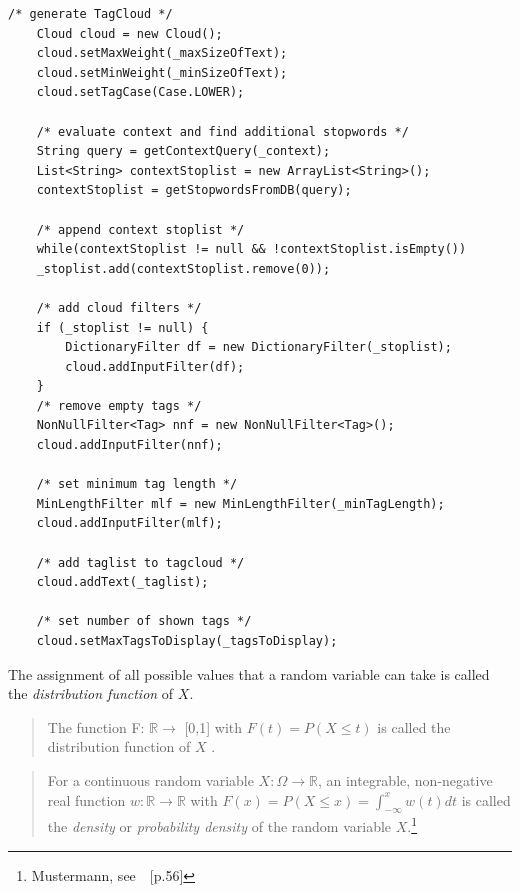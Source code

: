 \lstset{language=java}
\begin{lstlisting}[frame=htrbl, caption={This listing shows Java source code}, label={lst:result2}]
    /* generate TagCloud */
    Cloud cloud = new Cloud();
    cloud.setMaxWeight(_maxSizeOfText);
    cloud.setMinWeight(_minSizeOfText);
    cloud.setTagCase(Case.LOWER);
    
    /* evaluate context and find additional stopwords */
    String query = getContextQuery(_context);
    List<String> contextStoplist = new ArrayList<String>();
    contextStoplist = getStopwordsFromDB(query);
    
    /* append context stoplist */
    while(contextStoplist != null && !contextStoplist.isEmpty())
    _stoplist.add(contextStoplist.remove(0));
    
    /* add cloud filters */
    if (_stoplist != null) {
        DictionaryFilter df = new DictionaryFilter(_stoplist);
        cloud.addInputFilter(df);
    }
    /* remove empty tags */
    NonNullFilter<Tag> nnf = new NonNullFilter<Tag>();
    cloud.addInputFilter(nnf);
    
    /* set minimum tag length */
    MinLengthFilter mlf = new MinLengthFilter(_minTagLength);
    cloud.addInputFilter(mlf);
    
    /* add taglist to tagcloud */
    cloud.addText(_taglist);
    
    /* set number of shown tags */	    
    cloud.setMaxTagsToDisplay(_tagsToDisplay);
\end{lstlisting}


The assignment of all possible values that a random variable can take is called the \emph{distribution function} of $X$.

\begin{quotation}
    The function F: $\mathbb{R} \rightarrow$ [0,1] with $F(t) = P (X \le t)$ is called the distribution function of $X$ \cite[pp. 42--49]{mm2009}.
\end{quotation}

\begin{quotation}
    For a continuous random variable $X: \Omega \rightarrow \mathbb{R}$, an integrable, non-negative real function $w: \mathbb{R} \rightarrow \mathbb{R}$ with $F(x) = P(X \le x) = \int_{-\infty}^{x} w(t)dt$ is called the \emph{density} or \emph{probability density} of the random variable $X$.\footnote{Mustermann, see~\cite{mf2005}~[p.56]}
\end{quotation}
